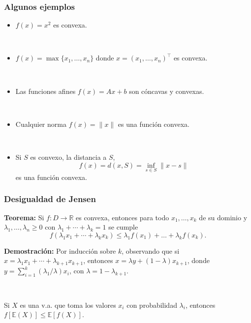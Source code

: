 \documentclass{beamer}
\begin{document}
\begin{frame}
\frametitle{Algunos ejemplos}

\begin{itemize}
\item $f(x) = x^2$ es convexa.

\

\item  $f(x)=\max\{x_1,\ldots,x_n\}$ donde $x=(x_1,\ldots,x_n)^\top$ es convexa.

\

\item Las funciones afines $f(x) = Ax+b$ son cóncavas y convexas.

\

\item Cualquier norma $f(x)= \|x\|$ es una función convexa.

\

\item Si $S$ es convexo, la distancia a $S$, 
\[
f(x)=d(x,S)=\inf_{s\in S}\|x-s\|
\]
es una función convexa. 
\end{itemize}


\end{frame}
\begin{frame}
\frametitle{Desigualdad de Jensen}

\textbf{Teorema:} Si $f:D\to \mathbb{R}$ es convexa, entonces para todo $x_1,\ldots,x_k$ de su dominio y $\lambda_1,\ldots,\lambda_n\geq 0$ con $\lambda_1+\cdots + \lambda_k=1$ se cumple
\[
f(\lambda_1x_1+\cdots + \lambda_k x_k)\leq \lambda_1 f(x_1) +\ldots + \lambda_k f(x_k).
\]

{\scriptsize
\textbf{Demostración:} Por inducción sobre $k$, observando que si $x=\lambda_1x_1+\cdots + \lambda_{k+1} x_{k+1}$, entonces  $
x = \lambda y + (1-\lambda) x_{k+1}$,
donde $y=\sum_{i=1}^k (\lambda_1/\lambda) x_i$, con $\lambda=1-\lambda_{k+1}$.
}

\


Si $X$ es una v.a. que toma los valores $x_i$ con probabilidad $\lambda_i$, entonces $f[\mathbb{E}(X)]\leq \mathbb{E}[f(X)]$.

\end{frame}
\end{document}
